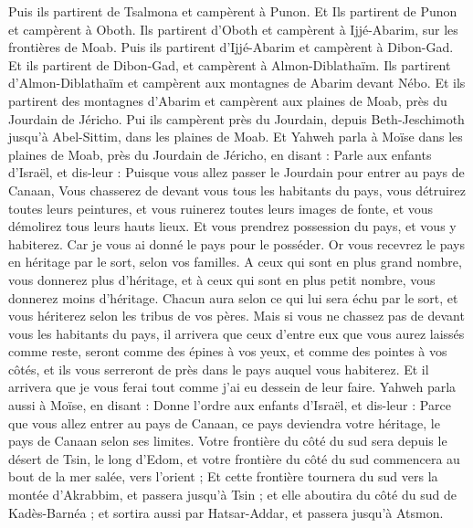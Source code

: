\begin{multicols}{2}
Puis ils partirent de Tsalmona et campèrent à Punon.
Et Ils partirent de Punon et campèrent à Oboth.
Ils partirent d'Oboth et campèrent à Ijjé-Abarim, sur les frontières de Moab.
Puis ils partirent d'Ijjé-Abarim et campèrent à Dibon-Gad.
Et ils partirent de Dibon-Gad, et campèrent à Almon-Diblathaïm.
Ils partirent d'Almon-Diblathaïm et campèrent aux montagnes de Abarim devant Nébo.
Et ils partirent des montagnes d'Abarim et campèrent aux plaines de Moab, près du Jourdain de Jéricho.
Pui ils campèrent près du Jourdain, depuis Beth-Jeschimoth jusqu'à Abel-Sittim, dans les plaines de Moab.
Et Yahweh parla à Moïse dans les plaines de Moab, près du Jourdain de Jéricho, en disant :
Parle aux enfants d'Israël, et dis-leur : Puisque vous allez passer le Jourdain pour entrer au pays de Canaan,
Vous chasserez de devant vous tous les habitants du pays, vous détruirez toutes leurs peintures, et vous ruinerez toutes leurs images de fonte, et vous démolirez tous leurs hauts lieux.
Et vous prendrez possession du pays, et vous y habiterez. Car je vous ai donné le pays pour le posséder.
Or vous recevrez le pays en héritage par le sort, selon vos familles. A ceux qui sont en plus grand nombre, vous donnerez plus d’héritage, et à ceux qui sont en plus petit nombre, vous donnerez moins d’héritage. Chacun aura selon ce qui lui sera échu par le sort, et vous hériterez selon les tribus de vos pères.
Mais si vous ne chassez pas de devant vous les habitants du pays, il arrivera que ceux d'entre eux que vous aurez laissés comme reste, seront comme des épines à vos yeux, et comme des pointes à vos côtés, et ils vous serreront de près dans le pays auquel vous habiterez.
Et il arrivera que je vous ferai tout comme j’ai eu dessein de leur faire.
\VerseOne{}Yahweh parla aussi à Moïse, en disant :
Donne l'ordre aux enfants d'Israël, et dis-leur :  Parce que vous allez entrer au pays de Canaan, ce pays deviendra votre héritage, le pays de Canaan selon ses limites.
Votre frontière du côté du sud sera depuis le désert de Tsin, le long d'Edom, et votre frontière du côté du sud commencera au bout de la mer salée, vers l'orient ;
Et cette frontière tournera du sud vers la montée d'Akrabbim, et passera jusqu'à Tsin ; et elle aboutira du côté du sud de Kadès-Barnéa ; et sortira aussi par Hatsar-Addar, et passera jusqu'à Atsmon.

\end{multicols}
